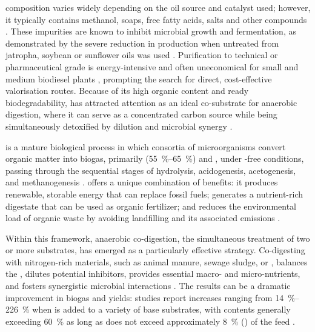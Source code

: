 \documentclass[12pt, a4paper, oneside]{report}
\begin{document}
 composition varies widely depending on the oil source and catalyst used; however, it typically contains methanol, soaps, free fatty acids, salts and other  compounds \parencite{anand2012, attarbachi2023}. These impurities are known to inhibit microbial growth and fermentation, as demonstrated by the severe reduction in  production when untreated  from jatropha, soybean or sunflower oils was used \parencite{anand2012}. Purification to technical or pharmaceutical grade is energy-intensive and often uneconomical for small and medium biodiesel plants \parencite{attarbachi2023}, prompting the search for direct, cost-effective valorisation routes. Because of its high organic content and ready biodegradability,  has attracted attention as an ideal co-substrate for anaerobic digestion, where it can serve as a concentrated carbon source while being simultaneously detoxified by dilution and microbial synergy \parencite{gebreegziabher2025, tomczak2025}.

 is a mature biological process in which consortia of microorganisms convert organic matter into biogas, primarily  (\qtyrange{55}{65}{\percent}) and , under -free conditions, passing through the sequential stages of hydrolysis, acidogenesis, acetogenesis, and methanogenesis \parencite{gebreegziabher2025}.  offers a unique combination of benefits: it produces renewable, storable energy that can replace fossil fuels; generates a nutrient-rich digestate that can be used as organic fertilizer; and reduces the environmental load of organic waste by avoiding landfilling and its associated  emissions \parencite{scherhaufer2018, gebreegziabher2025}.

Within this framework, anaerobic co-digestion, the simultaneous treatment of two or more substrates, has emerged as a particularly effective strategy. Co-digesting  with nitrogen-rich materials, such as animal manure, sewage sludge, or , balances the , dilutes potential inhibitors, provides essential macro- and micro-nutrients, and fosters synergistic microbial interactions \parencite{tomczak2025, gebreegziabher2025}. The results can be a dramatic improvement in biogas and  yields: studies report increases ranging from \qtyrange{14}{226}{\percent} when  is added to a variety of base substrates, with  contents generally exceeding \qty{60}{\percent} as long as  does not exceed approximately \qty{8}{\percent} () of the feed \parencite{gebreegziabher2025, tomczak2025}.
\end{document}
